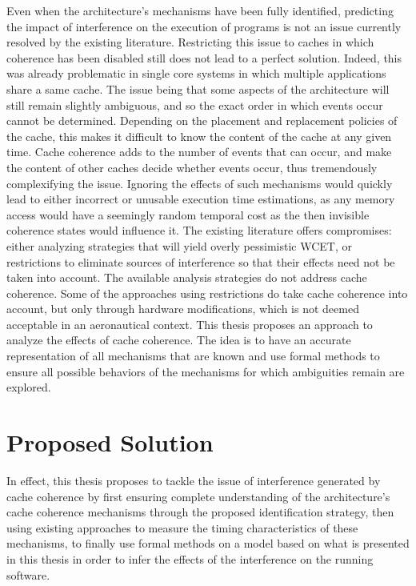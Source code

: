 Even when the architecture's mechanisms have been fully identified, predicting
the impact of interference on the execution of programs is not an issue
currently resolved by the existing literature. Restricting this issue to caches
in which coherence has been disabled still does not lead to a perfect solution.
Indeed, this was already problematic in single core systems in which multiple
applications share a same cache. The issue being that some aspects of the
architecture will still remain slightly ambiguous, and so the exact order in
which events occur cannot be determined.  Depending on the placement and
replacement policies of the cache, this makes it difficult to know the content
of the cache at any given time.  Cache coherence adds to the number of events
that can occur, and make the content of other caches decide whether events
occur, thus tremendously complexifying the issue. Ignoring the effects of
such mechanisms would quickly lead to either incorrect or unusable execution
time estimations, as any memory access would have a seemingly random temporal
cost as the then invisible coherence states would influence it. The existing
literature offers compromises: either analyzing strategies that will yield
overly pessimistic WCET, or restrictions to eliminate sources of interference so
that their effects need not be taken into account.  The available analysis
strategies do not address cache coherence. Some of the approaches using
restrictions do take cache coherence into account, but only through hardware
modifications, which is not deemed acceptable in an aeronautical context. This
thesis proposes an approach to analyze the effects of cache coherence. The idea
is to have an accurate representation of all mechanisms that are known and use
formal methods to ensure all possible behaviors of the mechanisms for which
ambiguities remain are explored.

\stopallthesefloats
\section{Proposed Solution}
In effect, this thesis proposes to tackle the issue of interference generated by
cache coherence by first ensuring complete understanding of the architecture's
cache coherence mechanisms through the proposed identification strategy, then
using existing approaches to measure the timing characteristics of these
mechanisms, to finally use formal methods on a model based on what is presented
in this thesis in order to infer the effects of the interference on the running
software.
